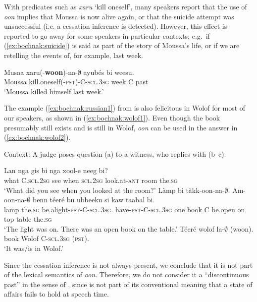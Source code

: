 \documentclass[output=paper,newtxmath,modfonts,nonflat,draftmode]{langsci/langscibook}
\begin{document}
With predicates such as \textit{xaru} `kill oneself', many speakers
report that the use of \textit{oon} implies that Moussa is now alive
again, or that the suicide attempt was unsuccessful (i.e. a cessation
inference is detected). However, this effect is reported to go away
for some speakers in
particular contexts; e.g.~if
(\ref{ex:bochnak:suicide}) is said as part of the story of Moussa's life, or if
we are retelling the events of, for example, last week.

\ea\label{ex:bochnak:suicide}
\gll Musaa xaru(-\textbf{woon})-na-$\emptyset$ ayub\'es bi weesu.\\
Moussa kill.oneself\textsc{(-pst)-C-scl.3sg} week C past\\
\glt `Moussa killed himself last week.'
\z

The example (\ref{ex:bochnak:russian1}) from \cite{klein94time} is also felicitous in Wolof for most
of our speakers, as shown in (\ref{ex:bochnak:wolof1}). Even though the book
presumably still exists and is still in Wolof,  \textit{oon} can be
used in the answer in (\ref{ex:bochnak:wolof2}).

  \begin{exe}
\ex\label{ex:bochnak:wolof1} Context: A judge poses question (a) to a witness, who replies with (b--c):
\begin{xlist}
\ex 
\gll Lan nga gis bi nga xool-e neeg bi?\\
what C.\textsc{scl.2sg} see when \textsc{scl.2sg} look.at-\textsc{ant} room the.\textsc{sg}\\
\glt`What did you see when you looked at the room?'
\ex
\gll L\`amp bi t\`akk-oon-na-$\emptyset$. Am-oon-na-$\emptyset$ benn t\'eer\'e bu ubbeeku si kaw taabal bi.\\
lamp the.\textsc{sg}
be.alight-\textsc{pst}-C-\textsc{scl.3sg}. have-\textsc{pst}-C-\textsc{scl.3sg}
one book C be.open on top table the.\textsc{sg}\\
\glt`The light was on. There was an open book on the table.'
\ex
\gll T\'eer\'e wolof la-$\emptyset$ (woon).\\
book Wolof C-\textsc{scl.3sg} (\textsc{pst}).\\
\glt `It was/is in Wolof.'\label{ex:bochnak:wolof2}

\end{xlist}
\end{exe}



Since the cessation inference is not always present, we conclude that it is not part of the lexical semantics of \textit{oon}. Therefore, we do not consider it a ``discontinuous past'' in the sense of \citet{Plungian2006}, since is not part of its conventional meaning that a state of affairs fails to hold at speech time.
\end{document}
